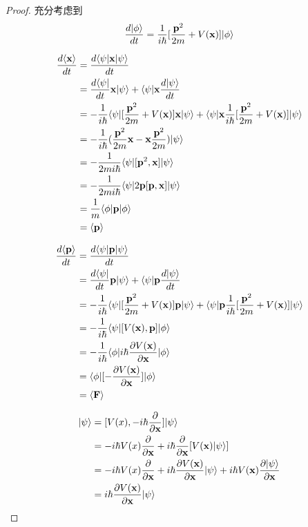 \begin{proof}
	充分考虑到
	\begin{equation}
	\frac{d| \phi \rangle}{dt}=\frac{1}{i\hbar}[\frac{\textbf{p}^2}{2m}+V(\textbf{x})]| \phi \rangle
	\end{equation}

	\begin{align*}
	\frac{d \langle \textbf{x} \rangle}{dt}  & = \frac{d \langle \psi | \textbf{x} | \psi \rangle}{dt} \\ 
	& = \frac{d\langle \psi |}{dt} \textbf{x} | \psi \rangle + \langle \psi | \textbf{x} \frac{d| \psi \rangle}{dt} \\
	&= - \frac{1}{i \hbar}\langle \psi |[\frac{\textbf{p}^2}{2m}+V(\textbf{x})]\textbf{x}| \psi \rangle+ \langle \psi |\textbf{x}\frac{1}{i\hbar}[\frac{\textbf{p}^2}{2m}+V(\textbf{x})]| \psi \rangle\\
	&= -\frac{1}{i\hbar}(\frac{\textbf{p}^2}{2m}\textbf{x}-\textbf{x}\frac{\textbf{p}^2}{2m})| \psi \rangle\\
	&= -\frac{1}{2mi\hbar}\langle \psi | [\textbf{p}^2,\textbf{x}] | \psi \rangle\\
	&=-\frac{1}{2mi\hbar}\langle \psi | 2\textbf{p}[\textbf{p},\textbf{x}] | \psi \rangle\\
	&=\frac{1}{m}\langle \phi | \textbf{p} | \phi \rangle\\
	&=\langle \textbf{p} \rangle
	\end{align*}

	\begin{align*}
	\frac{d\langle \textbf{p} \rangle}{dt} &= \frac{d\langle \psi | \textbf{p} | \psi \rangle}{dt}\\
	&=\frac{d\langle \psi |}{dt} \textbf{p} | \psi \rangle + \langle \psi | \textbf{p} \frac{d| \psi \rangle}{dt} \\
	&= - \frac{1}{i \hbar}\langle \psi |[\frac{\textbf{p}^2}{2m}+V(\textbf{x})]\textbf{p}| \psi \rangle+ \langle \psi |\textbf{p}\frac{1}{i\hbar}[\frac{\textbf{p}^2}{2m}+V(\textbf{x})]| \psi \rangle\\
	&= -\frac{1}{i\hbar}\langle \psi | [V(\textbf{x}),\textbf{p}] | \phi \rangle \\
	& = -\frac{1}{i\hbar}\langle \phi | i\hbar\frac{\partial V(\textbf{x})}{\partial \textbf{x}} | \phi \rangle\\
	& = \langle \phi | [-\frac{\partial V(\textbf{x})}{\partial \textbf{x}}] | \phi \rangle\\
	& = \langle \textbf{F} \rangle
	\end{align*}

	\begin{align*}
	[V(\textbf{x}),\textbf{p}] \ket{\psi} & = [V(x),-i\hbar \frac{\partial}{\partial \textbf{x}}]\ket{\psi}\\
	& = -i\hbar V(x) \frac{\partial }{\partial \textbf{x}} + i\hbar \frac{\partial}{\partial \textbf{x}}[V(\textbf{x})\ket{\psi}]\\
	&= -i\hbar V(x) \frac{\partial }{\partial \textbf{x}}+ i\hbar \frac{\partial V(\textbf{x})}{\partial \textbf{x}}\ket{\psi} + i\hbar V(\textbf{x}) \frac{\partial \ket{\psi}}{\partial \textbf{x}}\\
	&= i\hbar \frac{\partial V(\textbf{x})}{\partial \textbf{x}} \ket{\psi}
	\end{align*}
\end{proof}

